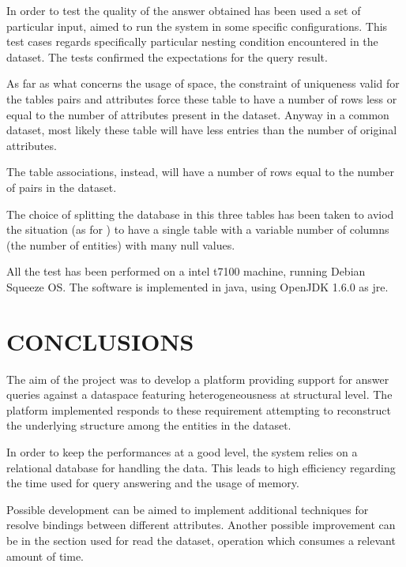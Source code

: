\documentclass{acm_proc_article-sp-sigmod07}
\begin{document}
In order to test the quality of the answer obtained has been used a set of
particular input, aimed to run the system in some specific configurations.
This test cases regards specifically particular nesting condition
encountered in the dataset.
The tests confirmed the expectations for the query result.

As far as what concerns the usage of space, the constraint of uniqueness
valid for the tables pairs and attributes force these table to have a
number of rows less or equal to the number of attributes present in the
dataset.
Anyway in a common dataset, most likely these table will have less entries
than the number of original attributes.

The table associations, instead, will have a number of rows equal to the
number of pairs in the dataset.

The choice of splitting the database in this three tables has been taken
to aviod the situation (as for \cite{dong:indexing}) to have a single
table with a variable number of columns (the number of entities) with many
null values.

All the test has been performed on a intel t7100 machine, running Debian
Squeeze OS. The software is implemented in java, using OpenJDK 1.6.0 as
jre.

\section{CONCLUSIONS}
The aim of the project was to develop a platform providing support for
answer queries against a dataspace featuring heterogeneousness at
structural level.
The platform implemented responds to these requirement attempting to
reconstruct the underlying structure among the entities in the dataset.

In order to keep the performances at a good level, the system relies on a
relational database for handling the data. This leads to high efficiency
regarding the time used for query answering and the usage of memory.

Possible development can be aimed to implement additional techniques for
resolve bindings between different attributes. Another possible
improvement can be in the section used for read the dataset, operation
which consumes a relevant amount of time.



\end{document}
